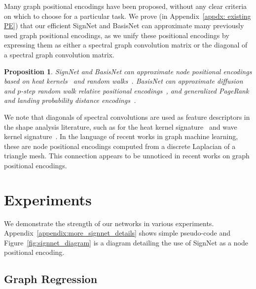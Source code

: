 \documentclass{article} \usepackage{iclr2023_conference,times}
\newtheorem{proposition}{Proposition}
\begin{document}
Many graph positional encodings have been proposed, without any clear criteria on which to choose for a particular task. We prove (in Appendix~\ref{appdx: existing PE}) that our efficient SignNet and BasisNet can approximate many previously used graph positional encodings, as we unify these positional encodings by expressing them as either a spectral graph convolution matrix or the diagonal of a spectral graph convolution matrix.
\begin{proposition}\label{prop:approximate_positional}
    SignNet and BasisNet can approximate node positional encodings based on heat kernels~\citep{feldman2022weisfeiler} and random walks~\citep{dwivedi2022graph}. BasisNet can approximate diffusion and $p$-step random walk relative positional encodings~\citep{mialon2021graphit}, and generalized PageRank and landing probability distance encodings~\citep{li2020distance}.
\end{proposition}
We note that diagonals of spectral convolutions are used as feature descriptors in the shape analysis literature, such as for the heat kernel signature~\citep{sun2009concise} and wave kernel signature~\citep{aubry2011wave}. In the language of recent works in graph machine learning, these are node positional encodings computed from a discrete Laplacian of a triangle mesh. This connection appears to be unnoticed in recent works on graph positional encodings.

\section{Experiments}\label{sec:experiments}

We demonstrate the strength of our networks in various experiments. Appendix~\ref{appendix:more_signnet_details} shows simple pseudo-code and Figure~\ref{fig:signnet_diagram} is a diagram detailing the use of SignNet as a node positional encoding.

\subsection{Graph Regression}\label{sec:graph_regression}
\end{document}
